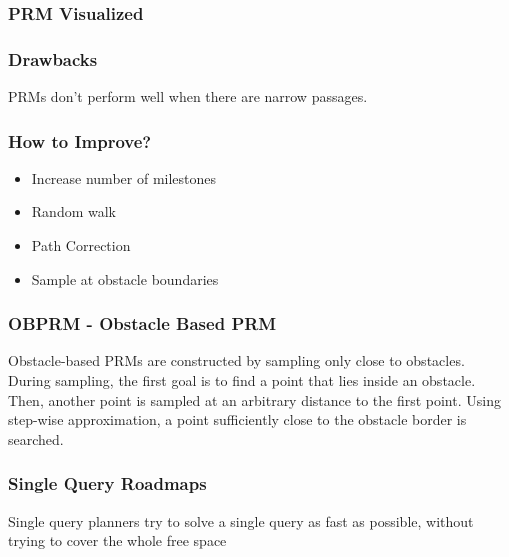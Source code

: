 \documentclass{beamer}
\begin{document}
  \begin{frame}
    \frametitle{PRM Visualized}
  
  \end{frame}

  \begin{frame}
    \frametitle{Drawbacks}
    PRMs don't perform well when there are narrow passages.
  
  \end{frame}

  \begin{frame}
    \frametitle{How to Improve?}
    \begin{itemize}
      \item Increase number of milestones
      \item Random walk
      \item Path Correction
      \item Sample at obstacle boundaries
    \end{itemize}
    
  
  \end{frame}

  \begin{frame}
    \frametitle{OBPRM - Obstacle Based PRM}
    Obstacle-based PRMs are constructed by sampling only close to
obstacles. During sampling, the first goal is to find a point that
lies inside an obstacle. Then, another point is sampled at an
arbitrary distance to the first point. Using step-wise approximation, a point sufficiently close to the obstacle border is searched.
  
  \end{frame}

  \begin{frame}
    \frametitle{Single Query Roadmaps}
    Single query planners try to solve a single query as fast as possible, without trying to cover the whole free space
    
  \end{frame}
\end{document}
